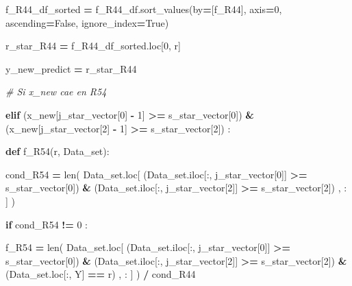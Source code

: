 \documentclass[
  11pt,
  a4paper,
]{article}
\newenvironment{Shaded}{\begin{snugshade}}{\end{snugshade}}
\newcommand{\BuiltInTok}[1]{#1}
\newcommand{\CommentTok}[1]{\textcolor[rgb]{0.56,0.35,0.01}{\textit{#1}}}
\newcommand{\ControlFlowTok}[1]{\textcolor[rgb]{0.13,0.29,0.53}{\textbf{#1}}}
\newcommand{\DecValTok}[1]{\textcolor[rgb]{0.00,0.00,0.81}{#1}}
\newcommand{\KeywordTok}[1]{\textcolor[rgb]{0.13,0.29,0.53}{\textbf{#1}}}
\newcommand{\NormalTok}[1]{#1}
\newcommand{\OperatorTok}[1]{\textcolor[rgb]{0.81,0.36,0.00}{\textbf{#1}}}
\newcommand{\StringTok}[1]{\textcolor[rgb]{0.31,0.60,0.02}{#1}}
\newcommand{\VariableTok}[1]{\textcolor[rgb]{0.00,0.00,0.00}{#1}}
\begin{document}
\begin{Shaded}
\begin{Highlighting}[]
\NormalTok{                f\_R44\_df\_sorted }\OperatorTok{=}\NormalTok{ f\_R44\_df.sort\_values(by}\OperatorTok{=}\NormalTok{[}\StringTok{\textquotesingle{}f\_R44\textquotesingle{}}\NormalTok{], axis}\OperatorTok{=}\DecValTok{0}\NormalTok{, ascending}\OperatorTok{=}\VariableTok{False}\NormalTok{, ignore\_index}\OperatorTok{=}\VariableTok{True}\NormalTok{)}

\NormalTok{                r\_star\_R44 }\OperatorTok{=}\NormalTok{ f\_R44\_df\_sorted.loc[}\DecValTok{0}\NormalTok{, }\StringTok{\textquotesingle{}r\textquotesingle{}}\NormalTok{]}


\NormalTok{                y\_new\_predict }\OperatorTok{=}\NormalTok{ r\_star\_R44}


            
            \CommentTok{\# Si x\_new cae en R54}

            \ControlFlowTok{elif}\NormalTok{ (x\_new[j\_star\_vector[}\DecValTok{0}\NormalTok{] }\OperatorTok{{-}} \DecValTok{1}\NormalTok{] }\OperatorTok{\textgreater{}=}\NormalTok{ s\_star\_vector[}\DecValTok{0}\NormalTok{]) }\OperatorTok{\&}\NormalTok{ (x\_new[j\_star\_vector[}\DecValTok{2}\NormalTok{] }\OperatorTok{{-}} \DecValTok{1}\NormalTok{] }\OperatorTok{\textgreater{}=}\NormalTok{ s\_star\_vector[}\DecValTok{2}\NormalTok{])  :}

 
                \KeywordTok{def}\NormalTok{ f\_R54(r, Data\_set):}

\NormalTok{                        cond\_R54 }\OperatorTok{=} \BuiltInTok{len}\NormalTok{( Data\_set.loc[ (Data\_set.iloc[:, j\_star\_vector[}\DecValTok{0}\NormalTok{]] }\OperatorTok{\textgreater{}=}\NormalTok{ s\_star\_vector[}\DecValTok{0}\NormalTok{]) }\OperatorTok{\&}\NormalTok{ (Data\_set.iloc[:, j\_star\_vector[}\DecValTok{2}\NormalTok{]] }\OperatorTok{\textgreater{}=}\NormalTok{ s\_star\_vector[}\DecValTok{2}\NormalTok{]) , : ] ) }

                        \ControlFlowTok{if}\NormalTok{  cond\_R54 }\OperatorTok{!=} \DecValTok{0}\NormalTok{ :}

\NormalTok{                            f\_R54 }\OperatorTok{=} \BuiltInTok{len}\NormalTok{( Data\_set.loc[ (Data\_set.iloc[:, j\_star\_vector[}\DecValTok{0}\NormalTok{]] }\OperatorTok{\textgreater{}=}\NormalTok{ s\_star\_vector[}\DecValTok{0}\NormalTok{]) }\OperatorTok{\&}\NormalTok{ (Data\_set.iloc[:, j\_star\_vector[}\DecValTok{2}\NormalTok{]] }\OperatorTok{\textgreater{}=}\NormalTok{ s\_star\_vector[}\DecValTok{2}\NormalTok{]) }\OperatorTok{\&}\NormalTok{ (Data\_set.loc[:, }\StringTok{\textquotesingle{}Y\textquotesingle{}}\NormalTok{] }\OperatorTok{==}\NormalTok{ r) , : ] ) }\OperatorTok{/}\NormalTok{ cond\_R44}


\end{Highlighting}
\end{Shaded}
\end{document}
